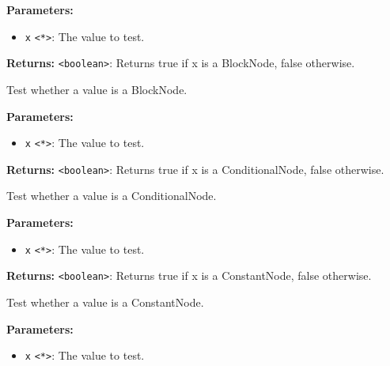 \documentclass[12pt,a4paper]{article}
\begin{document}
\noindent \textbf{Parameters:}
\begin{itemize}
  \item \texttt{x} \texttt{<*>}: The value to test.
\end{itemize}

\noindent \textbf{Returns:} \texttt{<boolean>}: Returns true if \textasciigrave{}x\textasciigrave{} is a BlockNode, false otherwise.

\noindent Test whether a value is a BlockNode.

\vspace{5mm}
\noindent {}


\noindent \textbf{Parameters:}
\begin{itemize}
  \item \texttt{x} \texttt{<*>}: The value to test.
\end{itemize}

\noindent \textbf{Returns:} \texttt{<boolean>}: Returns true if \textasciigrave{}x\textasciigrave{} is a ConditionalNode, false otherwise.

\noindent Test whether a value is a ConditionalNode.

\vspace{5mm}
\noindent {}


\noindent \textbf{Parameters:}
\begin{itemize}
  \item \texttt{x} \texttt{<*>}: The value to test.
\end{itemize}

\noindent \textbf{Returns:} \texttt{<boolean>}: Returns true if \textasciigrave{}x\textasciigrave{} is a ConstantNode, false otherwise.

\noindent Test whether a value is a ConstantNode.

\vspace{5mm}
\noindent {}


\noindent \textbf{Parameters:}
\begin{itemize}
  \item \texttt{x} \texttt{<*>}: The value to test.
\end{itemize}
\end{document}
